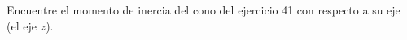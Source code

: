 \item Encuentre el momento de inercia del cono del ejercicio 41 con respecto a su eje (el eje $z$).

